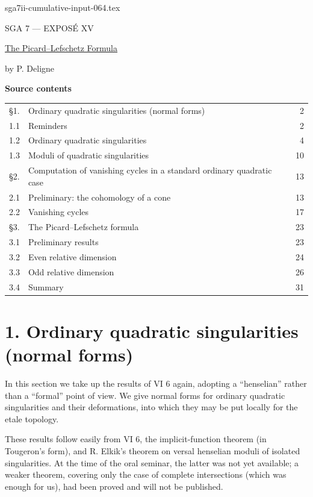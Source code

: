 \begin{filecontents*}{sga7ii-cumulative-input-064.tex}
\clearpage
\begin{center}
{\large SGA 7 --- EXPOS\'E XV}\par
\vspace{2em}
{\Large\underline{The Picard--Lefschetz Formula}}\par
\vspace{1.5em}
{\large by P. Deligne}
\end{center}

\medskip
\noindent\textbf{Source contents}
\begin{center}
\begin{tabular}{@{}llr@{}}
\S1. & Ordinary quadratic singularities (normal forms) & 2\\
1.1 & Reminders & 2\\
1.2 & Ordinary quadratic singularities & 4\\
1.3 & Moduli of quadratic singularities & 10\\
\S2. & Computation of vanishing cycles in a standard ordinary
  quadratic case & 13\\
2.1 & Preliminary: the cohomology of a cone & 13\\
2.2 & Vanishing cycles & 17\\
\S3. & The Picard--Lefschetz formula & 23\\
3.1 & Preliminary results & 23\\
3.2 & Even relative dimension & 24\\
3.3 & Odd relative dimension & 26\\
3.4 & Summary & 31
\end{tabular}
\end{center}

\section*{1. Ordinary quadratic singularities (normal forms)}

In this section we take up the results of VI 6 again, adopting a
``henselian'' rather than a ``formal'' point of view.  We give normal
forms for ordinary quadratic singularities and their deformations,
into which they may be put locally for the etale topology.

These results follow easily from VI 6, the implicit-function theorem
(in Tougeron's form), and R. Elkik's theorem on versal henselian
moduli of isolated singularities.  At the time of the oral seminar,
the latter was not yet available; a weaker theorem, covering only the
case of complete intersections (which was enough for us), had been
proved and will not be published.


\end{filecontents*}

